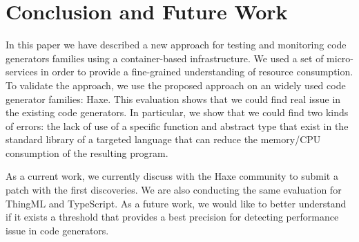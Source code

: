 \section{Conclusion and Future Work}

In this paper we have described a new approach for testing and monitoring code generators families using a container-based infrastructure. 
We used a set of micro-services in order to provide a fine-grained understanding of resource consumption. 
To validate the approach, we use the proposed approach on an widely used code generator families: Haxe. This evaluation shows that we could find real issue in the existing code generators. In particular, we show that we could find two kinds of errors: the lack of use of a specific function and abstract type that exist in the standard library of a targeted language  that can reduce the memory/CPU consumption of the resulting program.

As a current work, we currently discuss with the Haxe community to submit a patch with the first discoveries. We are also conducting the same evaluation for ThingML and TypeScript. As a future work, we would like to better understand if it exists a threshold that provides a best precision for detecting performance issue in code generators. 



